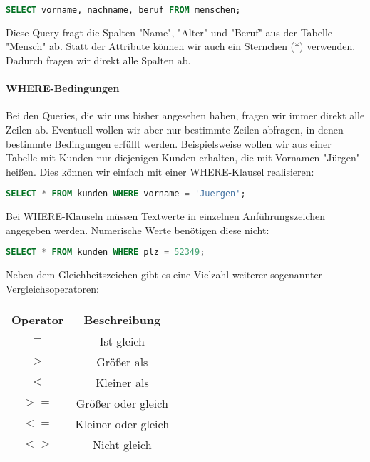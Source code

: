 \documentclass{article}
\begin{document}
	\begin{lstlisting}[language=SQL]
	SELECT vorname, nachname, beruf FROM menschen;
	\end{lstlisting}

	Diese Query fragt die Spalten "Name", "Alter" und "Beruf" aus der Tabelle "Mensch" ab.
	Statt der Attribute können wir auch ein Sternchen (*) verwenden. Dadurch fragen wir direkt alle Spalten ab.

	\paragraph{WHERE-Bedingungen}
	Bei den Queries, die wir uns bisher angesehen haben, fragen wir immer direkt alle Zeilen ab. Eventuell wollen wir aber nur bestimmte Zeilen abfragen, in denen bestimmte Bedingungen erfüllt werden. Beispielsweise wollen wir aus einer Tabelle mit Kunden nur diejenigen Kunden erhalten, die mit Vornamen "Jürgen" heißen. Dies können wir einfach mit einer WHERE-Klausel realisieren:

	\begin{lstlisting}[language=SQL]
	SELECT * FROM kunden WHERE vorname = 'Juergen';
	\end{lstlisting}

	Bei WHERE-Klauseln müssen Textwerte in einzelnen Anführungszeichen angegeben werden. Numerische Werte benötigen diese nicht:

	\begin{lstlisting}[language=SQL]
	SELECT * FROM kunden WHERE plz = 52349;
	\end{lstlisting}

	Neben dem Gleichheitszeichen gibt es eine Vielzahl weiterer sogenannter Vergleichsoperatoren:

	\begin{center}
		\def\arraystretch{1.1}
		\begin{tabular}{ | c | c |}
			\hline 
			\textbf{Operator} 	& \textbf{Beschreibung} \\
			\hline
			\hline
			\textbf{$=$} 		& Ist gleich \\
			\textbf{$>$} 		& Größer als \\
			\textbf{$<$} 		& Kleiner als \\
			\textbf{$>=$} 		& Größer oder gleich \\
			\textbf{$<=$} 		& Kleiner oder gleich \\
			\textbf{$<>$} 		& Nicht gleich \\
			\hline
		\end{tabular}
	\end{center}
\end{document}

